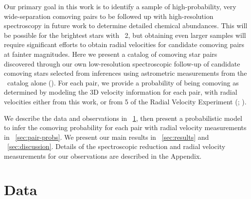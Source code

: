 \documentclass[modern, letterpaper]{aastex61}
\newcommand{\gaia}{\project{Gaia}}
\newcommand{\DR}[1]{\acronym{DR}#1}
\newcommand{\tgas}{\acronym{TGAS}}
\begin{document}
Our primary goal in this work is to identify a sample of high-probability, very
wide-separation comoving pairs to be followed up with high-resolution
spectroscopy in future work to determine detailed chemical abundances.
This will be possible for the brightest stars with \gaia\ \DR{2}, but obtaining
even larger samples will require significant efforts to obtain radial velocities
for candidate comoving pairs at fainter magnitudes.
Here we present a catalog of comoving star pairs discovered through our own
low-resolution spectroscopic follow-up of candidate comoving stars selected from
inferences using astrometric measurements from the \tgas\ catalog alone
(\citealt{Oh:2017}).
For each pair, we provide a probability of being comoving as determined by
modeling the 3D velocity information for each pair, with radial velocities
either from this work, or from \DR{5} of the Radial Velocity Experiment
(; \citealt{Kunder:2017}).

We describe the data and observations in \sectionname~\ref{sec:data}, then
present a probabilistic model to infer the comoving probability for each pair
with radial velocity measurements in \sectionname~\ref{sec:pair-probs}.
We present our main results in \sectionname~\ref{sec:results} and
\sectionname~\ref{sec:discussion}.
Details of the spectroscopic reduction and radial velocity measurements for our
observations are described in the Appendix.

\section{Data}\label{sec:data}
\end{document}
